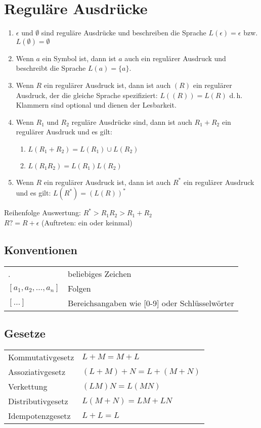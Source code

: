 \section{Reguläre Ausdrücke}
\begin{enumerate}\itemsep0em
	\item $\epsilon$ und $\emptyset$ sind reguläre Ausdrücke und beschreiben
	die Sprache $L(\epsilon) = \epsilon$ bzw. $L(\emptyset) = \emptyset$
	
	\item Wenn $a$ ein Symbol ist, dann ist $a$ auch ein regulärer Ausdruck und
	beschreibt die Sprache $L(a) = \{a\}$.
	
	\item Wenn $R$ ein regulärer Ausdruck ist, dann ist auch $(R)$ ein regulärer
	Ausdruck, der die gleiche Sprache spezifiziert: $L((R)) = L(R)$ 
	d.\,h. Klammern sind optional und dienen der Lesbarkeit.

	\item Wenn $R_1$ und $R_2$ reguläre Ausdrücke sind, dann ist auch $R_1 + R_2$ ein
	regulärer Ausdruck und es gilt: 
	\begin{enumerate}\itemsep0em
		\item $L(R_1 + R_2) = L(R_1) \cup L(R_2)$
		\item $L(R_1R_2) = L(R_1)L(R_2)$
	\end{enumerate}

	\item Wenn $R$ ein regulärer Ausdruck ist, dann ist auch $R^*$ ein regulärer Ausdruck
	und es gilt: $L(R^*) = (L(R))^*$

\end{enumerate}

Reihenfolge Auswertung: $R^* > R_1R_2 > R_1 + R_2$\\
$R? = R + \epsilon$ (Auftreten: ein oder keinmal)
\subsection{Konventionen}
\settowidth{\MyLenA}{$[a_1, a_2, \dots, a_n]$~~}
\begin{tabular}{@{}p{\the\MyLenA}%
				@{}p{\linewidth-\the\MyLenA}}
. & beliebiges Zeichen\\
$[a_1, a_2, \dots, a_n]$ & Folgen\\
$[\dots]$ & Bereichsangaben wie [0-9] oder Schlüsselwörter
\end{tabular}

\subsection{Gesetze}
\settowidth{\MyLenA}{Kommutativgesetz~~}
\begin{tabular}{@{}p{\the\MyLenA}%
				@{}p{\linewidth-\the\MyLenA}}
Kommutativgesetz & $L + M = M + L$\\
Assoziativgesetz & $(L + M) + N = L + (M + N)$\\
Verkettung & $(LM)N = L(MN)$\\
Distributivgesetz & $L(M + N) = LM + LN$\\ 
Idempotenzgesetz & $L + L = L$
\end{tabular}
